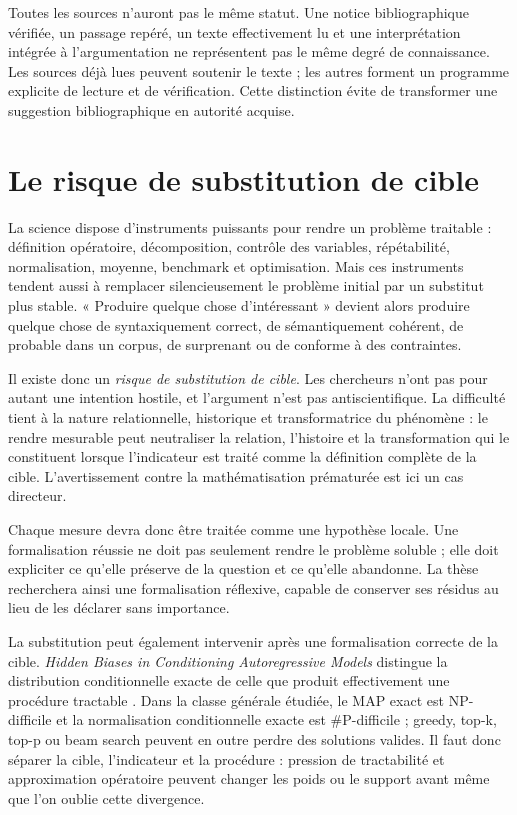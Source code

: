 \documentclass[11pt,a4paper]{article}
\begin{document}
Toutes les sources n'auront pas le même statut. Une notice bibliographique
vérifiée, un passage repéré, un texte effectivement lu et une interprétation
intégrée à l'argumentation ne représentent pas le même degré de connaissance.
Les sources déjà lues peuvent soutenir le texte ; les autres
forment un programme explicite de lecture et de vérification. Cette distinction
évite de transformer une suggestion bibliographique en autorité acquise.

\section{Le risque de substitution de cible}

La science dispose d'instruments puissants pour rendre un problème traitable :
définition opératoire, décomposition, contrôle des variables, répétabilité,
normalisation, moyenne, benchmark et optimisation. Mais ces instruments tendent
aussi à remplacer silencieusement le problème initial par un substitut plus
stable. « Produire quelque chose d'intéressant » devient alors produire quelque
chose de syntaxiquement correct, de sémantiquement cohérent, de probable dans un
corpus, de surprenant ou de conforme à des contraintes.

Il existe donc un \emph{risque de substitution de cible}. Les chercheurs n'ont
pas pour autant une intention hostile, et l'argument n'est pas antiscientifique.
La difficulté tient à la nature relationnelle, historique et
transformatrice du phénomène : le rendre mesurable peut neutraliser la relation,
l'histoire et la transformation qui le constituent lorsque l'indicateur est
traité comme la définition complète de la cible. L'avertissement contre la
mathématisation prématurée
\parencite{russell1995rationality,russell1995awardlecture} est ici un cas
directeur.

Chaque mesure devra donc être traitée comme une hypothèse locale. Une
formalisation réussie ne doit pas seulement rendre le problème soluble ; elle
doit expliciter ce qu'elle préserve de la question et ce qu'elle abandonne. La
thèse recherchera ainsi une formalisation réflexive, capable de conserver ses
résidus au lieu de les déclarer sans importance.

La substitution peut également intervenir après une formalisation correcte de
la cible. \emph{Hidden Biases in Conditioning Autoregressive Models} distingue
la distribution conditionnelle exacte de celle que produit effectivement une
procédure tractable \parencite{pachet2026biases}. Dans la classe générale
étudiée, le MAP exact est NP-difficile et la normalisation conditionnelle exacte
est \#P-difficile ; greedy, top-k, top-p ou beam search peuvent en outre perdre
des solutions valides. Il faut donc séparer la cible, l'indicateur et la
procédure : pression de tractabilité et approximation opératoire peuvent changer
les poids ou le support avant même que l'on oublie cette divergence.
\end{document}
